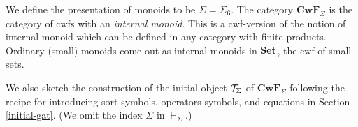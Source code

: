 \documentclass{mscs}
\newcommand{\FYI}[1]{{#1}}
\def\Cwf{\mathbf{CwF}}
\begin{document}
We define the \FYI{presentation of} monoids to be $\Sigma = \Sigma_6$. The category $\Cwf_\Sigma$ is the category of cwfs with an {\em internal monoid}. This is a cwf-version of the notion of internal monoid which can be defined in any category with finite products. Ordinary (small) monoids come out as internal monoids in ${\bf Set}$, the cwf of small sets.


We also sketch the construction of the initial object ${\mathcal T}_\Sigma$ of $\Cwf_\Sigma$ following the recipe for introducing sort symbols, operators symbols, and equations in Section \ref{initial-gat}. (We omit the index $\Sigma$ in $\vdash_\Sigma$.)
\end{document}

